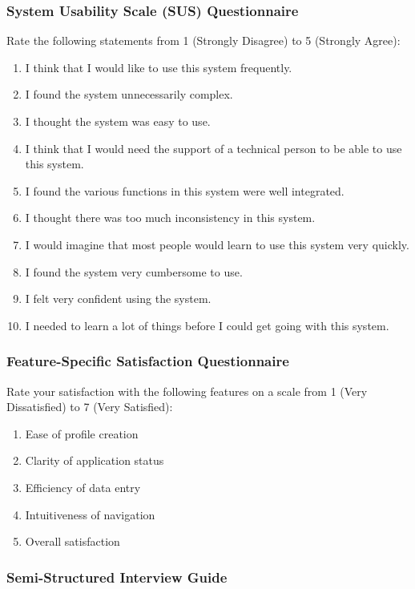 \documentclass[
	letterpaper, %
]{jdf}
\begin{document}
\begin{sloppypar}
\subsubsection{System Usability Scale (SUS) Questionnaire}

Rate the following statements from 1 (Strongly Disagree) to 5 (Strongly Agree):

\begin{enumerate}
    \item I think that I would like to use this system frequently.
    \item I found the system unnecessarily complex.
    \item I thought the system was easy to use.
    \item I think that I would need the support of a technical person to be able to use this system.
    \item I found the various functions in this system were well integrated.
    \item I thought there was too much inconsistency in this system.
    \item I would imagine that most people would learn to use this system very quickly.
    \item I found the system very cumbersome to use.
    \item I felt very confident using the system.
    \item I needed to learn a lot of things before I could get going with this system.
\end{enumerate}

\subsubsection{Feature-Specific Satisfaction Questionnaire}

Rate your satisfaction with the following features on a scale from 1 (Very Dissatisfied) to 7 (Very Satisfied):

\begin{enumerate}
    \item Ease of profile creation
    \item Clarity of application status
    \item Efficiency of data entry
    \item Intuitiveness of navigation
    \item Overall satisfaction
\end{enumerate}

\subsubsection{Semi-Structured Interview Guide}


\end{sloppypar}
\end{document}
